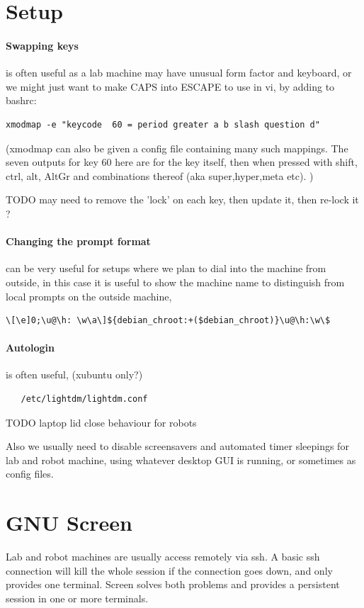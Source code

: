 \documentclass[oneside,english]{scrbook}
\begin{document}
\section{Setup}

\paragraph{Swapping keys} is often useful as a lab machine may have unusual form factor and keyboard, or we might just want to make CAPS into ESCAPE to use in vi, by adding to bashrc:

\begin{lstlisting}
xmodmap -e "keycode  60 = period greater a b slash question d"
\end{lstlisting}
(xmodmap can also be given a config file containing many such mappings.  The seven outputs for key 60 here are for the key itself, then when pressed with shift, ctrl, alt, AltGr and combinations thereof (aka super,hyper,meta etc). )

TODO may need to remove the 'lock' on each key, then update it, then re-lock it ?

\paragraph{Changing the prompt format} can be very useful for setups where we plan to dial into the machine from outside, in this case it is useful to show the machine name to distinguish from local prompts on the outside machine,
\begin{lstlisting}
\[\e]0;\u@\h: \w\a\]${debian_chroot:+($debian_chroot)}\u@\h:\w\$
\end{lstlisting}

\paragraph{Autologin} is often useful, (xubuntu only?)
\begin{lstlisting}
   /etc/lightdm/lightdm.conf
\end{lstlisting}

TODO laptop lid close behaviour for robots

Also we usually need to disable screensavers and automated timer sleepings for lab and robot machine, using whatever desktop GUI is running, or sometimes as config files.

\section{GNU Screen}
Lab and robot machines are usually access remotely via ssh.  A basic ssh connection will kill the whole session if the connection goes down, and only provides one terminal.   Screen solves both problems and provides a persistent session in one or more terminals.
\end{document}

